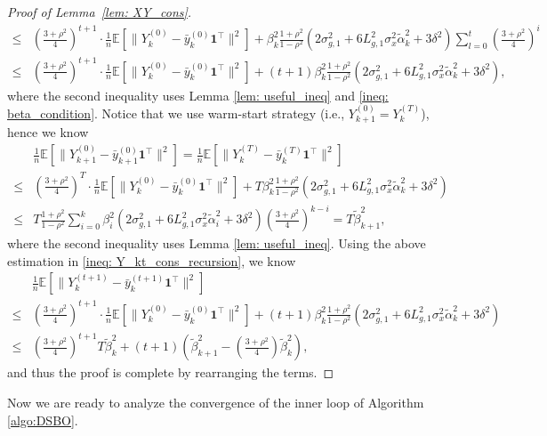 \documentclass{article}
\theoremstyle{plain}
\theoremstyle{definition}
\theoremstyle{remark}
\newcommand{\E}{\mathbb{E}}
\newcommand{\bfonet}{\mathbf{1}^{\top}}
\begin{document}
\begin{proof}[Proof of Lemma~\ref{lem: XY_cons}]
\begin{equation}
\begin{aligned}
        \leq &\left(\frac{3+\rho^2}{4}\right)^{t+1}\cdot\frac{1}{n}\E\left[\|Y_k^{(0)} - \bar{y}_k^{(0)}\bfonet\|^2\right] + \beta_k^2\frac{1+\rho^2}{1-\rho^2}(2\sigma_{g,1}^2 + 6L_{g,1}^2\sigma_x^2\tilde{\alpha}_k^2 + 3\delta^2)\sum_{l=0}^{t}\left(\frac{3+\rho^2}{4}\right)^i \\
        \leq &\left(\frac{3+\rho^2}{4}\right)^{t+1}\cdot\frac{1}{n}\E\left[\|Y_k^{(0)} - \bar{y}_k^{(0)}\bfonet\|^2\right] + (t+1)\beta_k^2\frac{1+\rho^2}{1-\rho^2}(2\sigma_{g,1}^2 + 6L_{g,1}^2\sigma_x^2\tilde{\alpha}_k^2 + 3\delta^2),
        \end{aligned}
    \end{equation}
    where the second inequality uses Lemma \ref{lem: useful_ineq} and \eqref{ineq: beta_condition}. Notice that we use warm-start strategy (i.e., $Y_{k+1}^{(0)} = Y_{k}^{(T)}$), hence we know
    \begin{align*}
        &\frac{1}{n}\E\left[\|Y_{k+1}^{(0)} - \bar{y}_{k+1}^{(0)}\bfonet\|^2\right] = \frac{1}{n}\E\left[\|Y_{k}^{(T)} - \bar{y}_{k}^{(T)}\bfonet\|^2\right]\\
            \leq &\left(\frac{3+\rho^2}{4}\right)^{T}\cdot\frac{1}{n}\E\left[\|Y_k^{(0)} - \bar{y}_k^{(0)}\bfonet\|^2\right] + T\beta_k^2\frac{1+\rho^2}{1-\rho^2}(2\sigma_{g,1}^2 + 6L_{g,1}^2\sigma_x^2\tilde{\alpha}_k^2 + 3\delta^2) \\
            \leq & T\frac{1+\rho^2}{1-\rho^2}\sum_{i=0}^{k}\beta_i^2(2\sigma_{g,1}^2 + 6L_{g,1}^2\sigma_x^2\tilde{\alpha}_i^2 + 3\delta^2)\left(\frac{3+\rho^2}{4}\right)^{k-i} = T\tilde{\beta}_{k+1}^2,
    \end{align*}
    where the second inequality uses Lemma \ref{lem: useful_ineq}. Using the above estimation in \eqref{ineq: Y_kt_cons_recursion}, we know
    \begin{align*}
        &\frac{1}{n}\E\left[\|Y_{k}^{(t+1)} - \bar{y}_{k}^{(t+1)}\bfonet\|^2\right]\\
        \leq &\left(\frac{3+\rho^2}{4}\right)^{t+1}\cdot\frac{1}{n}\E\left[\|Y_k^{(0)} - \bar{y}_k^{(0)}\bfonet\|^2\right] + (t+1)\beta_k^2\frac{1+\rho^2}{1-\rho^2}(2\sigma_{g,1}^2 + 6L_{g,1}^2\sigma_x^2\tilde{\alpha}_k^2 + 3\delta^2) \\
        \leq & \left(\frac{3+\rho^2}{4}\right)^{t+1}T\tilde{\beta}_k^2 + (t+1)\left(\tilde{\beta}_{k+1}^2 - \left(\frac{3+\rho^2}{4}\right)\tilde{\beta}_k^2\right),
    \end{align*}
    and thus the proof is complete by rearranging the terms.
\end{proof}
Now we are ready to analyze the convergence of the inner loop of Algorithm \ref{algo:DSBO}.
\end{document}
